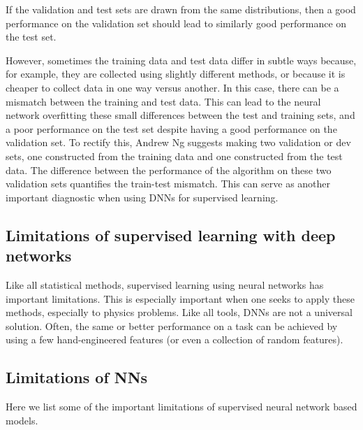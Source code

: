 \documentclass[%
oneside,                 %
final,                   %
10pt]{article}
\begin{document}
\noindent
If the validation and test sets are drawn from the same distributions,
then a good performance on the validation set should lead to similarly
good performance on the test set. 

However, sometimes
the training data and test data differ in subtle ways because, for
example, they are collected using slightly different methods, or
because it is cheaper to collect data in one way versus another. In
this case, there can be a mismatch between the training and test
data. This can lead to the neural network overfitting these small
differences between the test and training sets, and a poor performance
on the test set despite having a good performance on the validation
set. To rectify this, Andrew Ng suggests making two validation or dev
sets, one constructed from the training data and one constructed from
the test data. The difference between the performance of the algorithm
on these two validation sets quantifies the train-test mismatch. This
can serve as another important diagnostic when using DNNs for
supervised learning.

\subsection{Limitations of supervised learning with deep networks}

Like all statistical methods, supervised learning using neural
networks has important limitations. This is especially important when
one seeks to apply these methods, especially to physics problems. Like
all tools, DNNs are not a universal solution. Often, the same or
better performance on a task can be achieved by using a few
hand-engineered features (or even a collection of random
features). 

\subsection{Limitations of NNs}

Here we list some of the important limitations of supervised neural network based models. 
\end{document}
